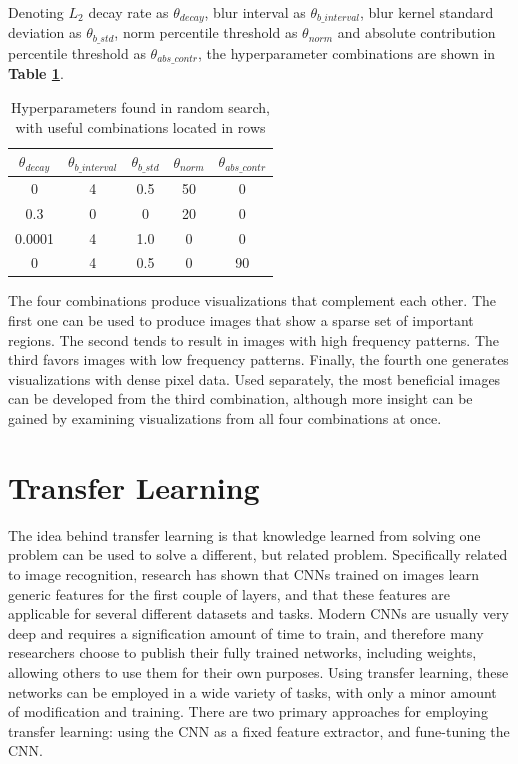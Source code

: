 \noindent Denoting $L_2$ decay rate as $\theta_{decay}$, blur interval as $\theta_{b\_interval}$, blur kernel standard deviation as $\theta_{b\_std}$, norm percentile threshold as $\theta_{norm}$ and absolute contribution percentile threshold as $\theta_{abs\_contr}$, the hyperparameter combinations are shown in \textbf{Table \ref{tab:reg_hyperparams}}.

\begin{table}[!h]
\begin{center}
\begin{tabular}{|c|c|c|c|c|}
\hline
\textbf{$\theta_{decay}$} & \textbf{$\theta_{b\_interval}$} & \textbf{$\theta_{b\_std}$} & \textbf{$\theta_{norm}$} & \textbf{$\theta_{abs\_contr}$} \\ \hline
0 & 4 & 0.5 & 50 & 0 \\ \hline
0.3 & 0 & 0 & 20 & 0 \\ \hline
0.0001 & 4 & 1.0 & 0 & 0 \\ \hline
0 & 4 & 0.5 & 0 & 90 \\ \hline
\end{tabular}
\end{center}
\caption[Hyperparameters found in random search.]{Hyperparameters found in random search, with useful combinations located in rows}
\label{tab:reg_hyperparams}
\end{table}

\noindent The four combinations produce visualizations that complement each other. The first one can be used to produce images that show a sparse set of important regions. The second tends to result in images with high frequency patterns. The third favors images with low frequency patterns. Finally, the fourth one generates visualizations with dense pixel data. Used separately, the most beneficial images can be developed from the third combination, although more insight can be gained by examining visualizations from all four combinations at once.

\section{Transfer Learning} \label{transfer-learning}

The idea behind transfer learning is that knowledge learned from solving one problem can be used to solve a different, but related problem. Specifically related to image recognition, research has shown that CNNs trained on images learn generic features for the first couple of layers, and that these features are applicable for several different datasets and tasks. Modern CNNs are usually very deep and requires a signification amount of time to train, and therefore many researchers choose to publish their fully trained networks, including weights, allowing others to use them for their own purposes. Using transfer learning, these networks can be employed in a wide variety of tasks, with only a minor amount of modification and training. There are two primary approaches for employing transfer learning: using the CNN as a fixed feature extractor, and fune-tuning the CNN. \\ 


